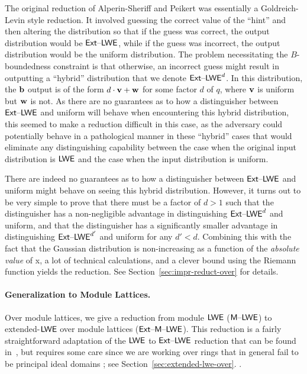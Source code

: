 The original reduction of Alperin-Sheriff and Peikert was essentially
a Goldreich-Levin style reduction. It involved guessing the correct
value of the ``hint'' and then altering the distribution so that if
the guess was correct, the output distribution would be $\mathsf{Ext \text{\textendash} LWE}$,
while if the guess was incorrect, the output distribution would be the
uniform distribution.  The problem necessitating the $B$-boundedness
constraint is that otherwise, an incorrect guess might result in
outputting a ``hybrid'' distribution that we denote  $\mathsf{Ext \text{\textendash} LWE}^{d}$. In
this distribution, the $\mathbf{b}$ output is
of the form $d\cdot \mathbf{v} + \mathbf{w}$ for some factor $d$ of $q$, where
$\mathbf{v}$ is uniform but $\mathbf{w}$ is not. As there are no guarantees as
to how a distinguisher between $\mathsf{Ext \text{\textendash} LWE}$ and uniform will behave when
encountering this hybrid distribution, this seemed to make a reduction
difficult in this case, as the adversary could potentially behave in a
pathological manner in these ``hybrid'' cases that would eliminate
any distinguishing capability between the case when the original input distribution is
$\mathsf{LWE}$ and the case when the input distribution is uniform.

There are indeed no guarantees as to how a distinguisher between
$\mathsf{Ext \text{\textendash} LWE}$ and uniform might
behave on seeing this hybrid distribution. However, it turns out to be very
simple to prove that there must be a factor of $d>1$ such that the
distinguisher has a non-negligible advantage in distinguishing
$\mathsf{Ext \text{\textendash} LWE}^{d}$ and uniform, and that the distinguisher has a
significantly smaller advantage in distinguishing $\mathsf{Ext \text{\textendash} LWE}^{d'}$ and
uniform for any $d' < d$. Combining this with the fact that the
Gaussian distribution is non-increasing as a function of the
\emph{absolute value} of x, a lot of technical calculations, and a
clever bound using the Riemann function yields the reduction.
See Section~\ref{sec:impr-reduct-over} for
details. 
\vspace{-15pt}
\paragraph{Generalization to Module Lattices.} Over module lattices, we give a reduction from module $\mathsf{LWE}$ ($\mathsf{M \text{\textendash} LWE}$)
to extended-$\mathsf{LWE}$ over module lattices
($\mathsf{Ext \text{\textendash} M \text{\textendash} LWE}$). This reduction is a fairly straightforward adaptation of
the $\mathsf{LWE}$ to $\mathsf{Ext \text{\textendash} LWE}$ reduction that can be found in~\cite{DBLP:conf/stoc/BrakerskiLPRS13}, but requires some care since we are
working over rings that in general fail to be principal ideal
domains 
\iflncs 
; see
Section~\ref{sec:extended-lwe-over}.
\else
.
\fi


